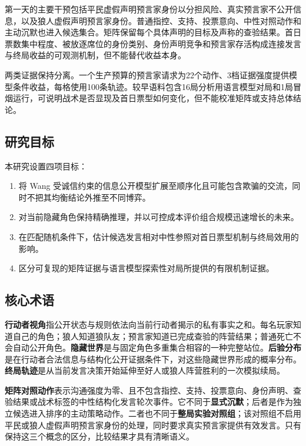 \documentclass[UTF8,11pt,a4paper,fontset=windows]{ctexart}
\newcommand{\term}[1]{\textbf{#1}}
\begin{document}
第一天的主要干预包括平民虚假声明预言家身份以分担风险、真实预言家不公开信息，以及狼人虚假声明预言家身份。普通指控、支持、投票意向、中性对照动作和主动沉默也进入候选集合。矩阵保留每个具体声明的目标及声称的查验结果。首日票数集中程度、被放逐席位的身份类别、身份声明竞争和预言家存活构成连接发言与终局收益的可观测机制，但不能替代收益本身。

两类证据保持分离。一个生产预算的预言家请求为22个动作、3档证据强度提供模型条件收益，每格使用100条轨迹。较早语料包含16局分析用语言模型对局和1局冒烟运行，可说明战术是否显现及首日票型如何变化，但不能校准矩阵或支持总体结论。

\subsection{研究目标}

本研究设置四项目标：

\begin{enumerate}
  \item 将 Wang 受诚信约束的信息公开模型扩展至顺序化且可能包含欺骗的交流，同时不把其均衡结论外推至不同博弈。
  \item 对当前隐藏角色保持精确推理，并以可控成本评价组合规模迅速增长的未来。
  \item 在匹配随机条件下，估计候选发言相对中性参照对首日票型机制与终局效用的影响。
  \item 区分可复现的矩阵证据与语言模型探索性对局所提供的有限机制证据。
\end{enumerate}

\subsection{核心术语}

\term{行动者视角}指公开状态与规则依法向当前行动者揭示的私有事实之和。每名玩家知道自己的角色；狼人知道狼队友；预言家知道已完成查验的阵营结果；普通死亡不会自动公开角色。\term{隐藏世界}是与固定角色多重集合相容的一种完整站位。\term{后验分布}是在行动者合法信息与结构化公开证据条件下，对这些隐藏世界形成的概率分布。\term{终局轨迹}是从当前发言决策开始延伸至好人或狼人阵营胜利的一次模拟续局。

\term{矩阵对照动作}表示沟通强度为零、且不包含指控、支持、投票意向、身份声明、查验结果或战术标签的中性结构化发言轮次事件。它不同于\term{显式沉默}；后者是作为独立候选进入排序的主动策略动作。二者也不同于\term{整局实验对照组}；该对照组不启用平民或狼人虚假声明预言家身份的处理，同时要求真实预言家提供有效发言。只有保持这三个概念的区分，比较结果才具有清晰语义。
\end{document}
